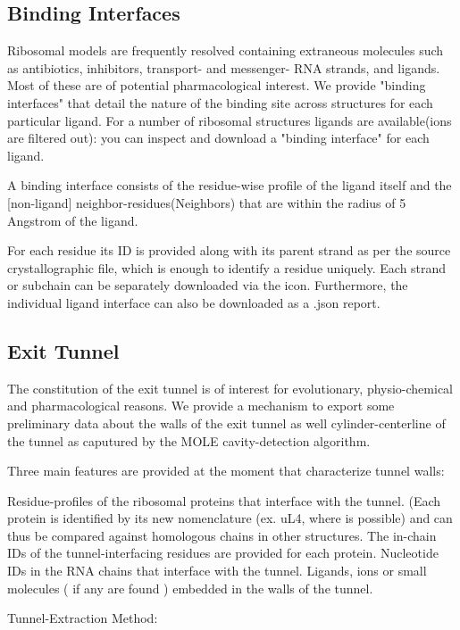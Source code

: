 \documentclass[11pt]{article}
\begin{document}
\subsection{Binding Interfaces}

Ribosomal models are frequently resolved containing extraneous molecules such as antibiotics, inhibitors, transport- and messenger- RNA strands, and ligands. Most of these are of potential pharmacological interest. We provide "binding interfaces" that detail the nature of the binding site across structures for each particular ligand. For a number of ribosomal structures ligands are available(ions are filtered out): you can inspect and download a "binding interface" for each ligand.

A binding interface consists of the residue-wise profile of the ligand itself and the [non-ligand] neighbor-residues(Neighbors) that are within the radius of 5 Angstrom of the ligand.

For each residue its ID is provided along with its parent strand as per the source crystallographic file, which is enough to identify a residue uniquely. Each strand or subchain can be separately downloaded via the icon. Furthermore, the individual ligand interface can also be downloaded as a .json report.

\subsection{Exit Tunnel}

The constitution of the exit tunnel is of interest for evolutionary, physio-chemical and pharmacological reasons. We provide a mechanism to export some preliminary data about the walls of the exit tunnel as well cylinder-centerline of the tunnel as caputured by the MOLE cavity-detection algorithm.

Three main features are provided at the moment that characterize tunnel walls:

    Residue-profiles of the ribosomal proteins that interface with the tunnel. (Each protein is identified by its new nomenclature (ex. uL4, where is possible) and can thus be compared against homologous chains in other structures. The in-chain IDs of the tunnel-interfacing residues are provided for each protein.
    Nucleotide IDs in the RNA chains that interface with the tunnel.
    Ligands, ions or small molecules ( if any are found ) embedded in the walls of the tunnel.

Tunnel-Extraction Method:
\end{document}
